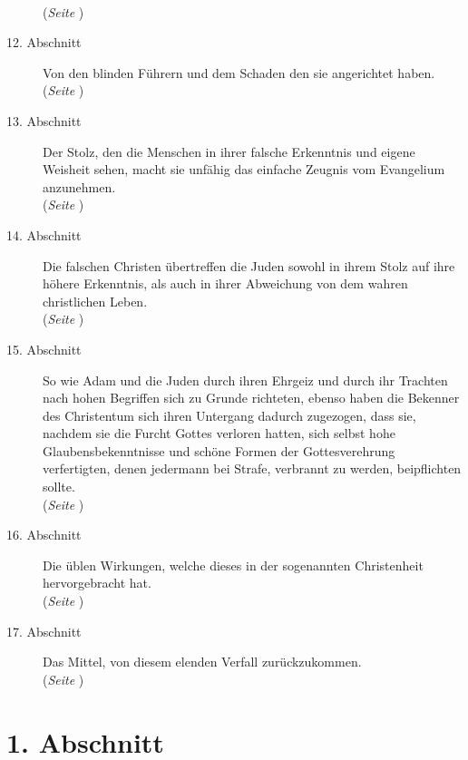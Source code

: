 \begin{description}
\\(\textit{Seite \pageref{kap7_ab11}})
\item[12. Abschnitt] Von den blinden Führern und dem Schaden den sie angerichtet
haben.
\\(\textit{Seite \pageref{kap7_ab12}})
\item[13. Abschnitt] Der Stolz, den die Menschen in ihrer falsche Erkenntnis und
eigene Weisheit sehen, macht sie unfähig das einfache Zeugnis vom Evangelium
anzunehmen.
\\(\textit{Seite \pageref{kap7_ab13}})
\item[14. Abschnitt] Die falschen Christen übertreffen die Juden sowohl in ihrem
Stolz auf ihre höhere Erkenntnis, als auch in ihrer Abweichung von dem wahren
christlichen Leben.
\\(\textit{Seite \pageref{kap7_ab14}})
\item[15. Abschnitt] So wie Adam und die Juden durch ihren Ehrgeiz und durch ihr
Trachten nach hohen Begriffen sich zu Grunde richteten, ebenso haben die
Bekenner des Christentum sich ihren Untergang dadurch zugezogen, dass sie,
nachdem sie die Furcht Gottes verloren hatten, sich selbst hohe
Glaubensbekenntnisse und schöne Formen der Gottesverehrung verfertigten, denen
jedermann bei Strafe, verbrannt zu werden, beipflichten sollte.
\\(\textit{Seite \pageref{kap7_ab15}})
\item[16. Abschnitt] Die üblen Wirkungen, welche dieses in der sogenannten
Christenheit hervorgebracht hat.
\\(\textit{Seite \pageref{kap7_ab16}})
\item[17. Abschnitt] Das Mittel, von diesem elenden Verfall zurückzukommen.
\\(\textit{Seite \pageref{kap7_ab17}})

\end{description}
\normalsize


\section{1. Abschnitt} \label{kap7_ab1}

